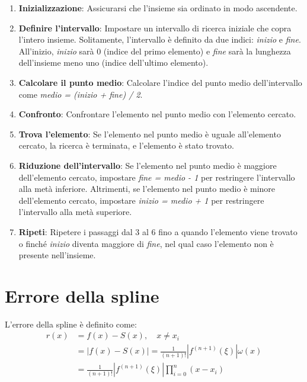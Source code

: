\begin{enumerate}
  \item \textbf{Inizializzazione}: Assicurarsi che l'insieme sia ordinato in modo ascendente.

  \item \textbf{Definire l'intervallo}: Impostare un intervallo di ricerca iniziale che copra l'intero insieme. Solitamente, l'intervallo è definito da due indici: \textit{inizio} e \textit{fine}. All'inizio, \textit{inizio} sarà 0 (indice del primo elemento) e \textit{fine} sarà la lunghezza dell'insieme meno uno (indice dell'ultimo elemento).

  \item \textbf{Calcolare il punto medio}: Calcolare l'indice del punto medio dell'intervallo come \textit{medio = (inizio + fine) / 2}.

  \item \textbf{Confronto}: Confrontare l'elemento nel punto medio con l'elemento cercato.

  \item \textbf{Trova l'elemento}: Se l'elemento nel punto medio è uguale all'elemento cercato, la ricerca è terminata, e l'elemento è stato trovato.

  \item \textbf{Riduzione dell'intervallo}: Se l'elemento nel punto medio è maggiore dell'elemento cercato, impostare \textit{fine = medio - 1} per restringere l'intervallo alla metà inferiore. Altrimenti, se l'elemento nel punto medio è minore dell'elemento cercato, impostare \textit{inizio = medio + 1} per restringere l'intervallo alla metà superiore.

  \item \textbf{Ripeti}: Ripetere i passaggi dal 3 al 6 fino a quando l'elemento viene trovato o finché \textit{inizio} diventa maggiore di \textit{fine}, nel qual caso l'elemento non è presente nell'insieme.
\end{enumerate}



\section{Errore della spline}
L'errore della spline è definito come:
\begin{align}
  r(x) &= f(x) - S(x), \quad x \neq x_i \\
       &= | f(x) - S(x) | = \frac{1}{(n+1)!} | f^{(n+1)}(\xi) | \omega(x) \\
       &= \frac{1}{(n+1)!} | f^{(n+1)}(\xi) | \prod_{i=0}^n (x - x_i)
\end{align}





